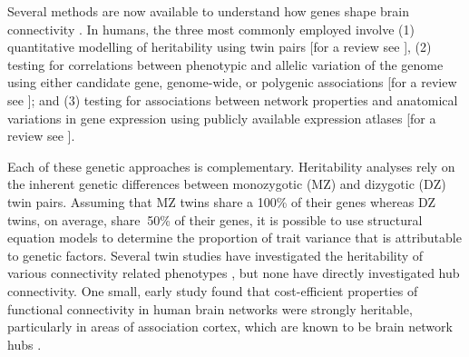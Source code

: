 Several methods are now available to understand how genes shape brain connectivity \citep{Lein2017,Luo2018}. In humans, the three most commonly employed involve (1) quantitative modelling of heritability using twin pairs [for a review see \citep{Jansen2015}], (2) testing for correlations between phenotypic and allelic variation of the genome using either candidate gene, genome-wide, or polygenic associations [for a review see \citep{Thompson2013}]; and (3) testing for associations between network properties and anatomical variations in gene expression using publicly available expression atlases [for a review see \citep{Fornito2019}].

Each of these genetic approaches is complementary. Heritability analyses rely on the inherent genetic differences between monozygotic (MZ) and dizygotic (DZ) twin pairs. Assuming that MZ twins share a 100\% of their genes whereas DZ twins, on average, share $~$50\% of their genes, it is possible to use structural equation models to determine the proportion of trait variance that is attributable to genetic factors. Several twin studies have investigated the heritability of various connectivity related phenotypes \citep{Bohlken2014,Colclough2017,Fu2015,Shen2014,Sudre2017}, but none have directly investigated hub connectivity. One small, early study found that cost-efficient properties of functional connectivity in human brain networks were strongly heritable, particularly in areas of association cortex, which are known to be brain network hubs \citep{Fornito2011}.

